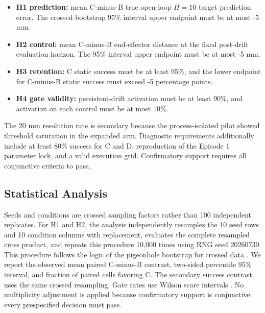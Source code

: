 \documentclass[10pt]{article}
\begin{document}
\begin{itemize}[leftmargin=*]

\item \textbf{H1 prediction:} mean C-minus-B true open-loop \(H=10\) target prediction error. The crossed-bootstrap 95\% interval upper endpoint must be at most -5 mm.

\item \textbf{H2 control:} mean C-minus-B end-effector distance at the fixed post-drift evaluation horizon. The 95\% interval upper endpoint must be at most -5 mm.

\item \textbf{H3 retention:} C static success must be at least 95\%, and the lower endpoint for C-minus-B static success must exceed -5 percentage points.

\item \textbf{H4 gate validity:} persistent-drift activation must be at least 90\%, and activation on each control must be at most 10\%.

\end{itemize}

The 20 mm resolution rate is secondary because the process-isolated pilot showed threshold saturation in the expanded arm. Diagnostic requirements additionally include at least 80\% success for C and D, reproduction of the Episode 1 parameter lock, and a valid execution grid. Confirmatory support requires all conjunctive criteria to pass.

\subsection{Statistical Analysis}

Seeds and conditions are crossed sampling factors rather than 100 independent replicates. For H1 and H2, the analysis independently resamples the 10 seed rows and 10 condition columns with replacement, evaluates the complete resampled cross product, and repeats this procedure 10,000 times using RNG seed 20260730. This procedure follows the logic of the pigeonhole bootstrap for crossed data \cite{owen2007pigeonhole}. We report the observed mean paired C-minus-B contrast, two-sided percentile 95\% interval, and fraction of paired cells favoring C. The secondary success contrast uses the same crossed resampling. Gate rates use Wilson score intervals \cite{wilson1927inference}. No multiplicity adjustment is applied because confirmatory support is conjunctive: every prespecified decision must pass.
\end{document}
